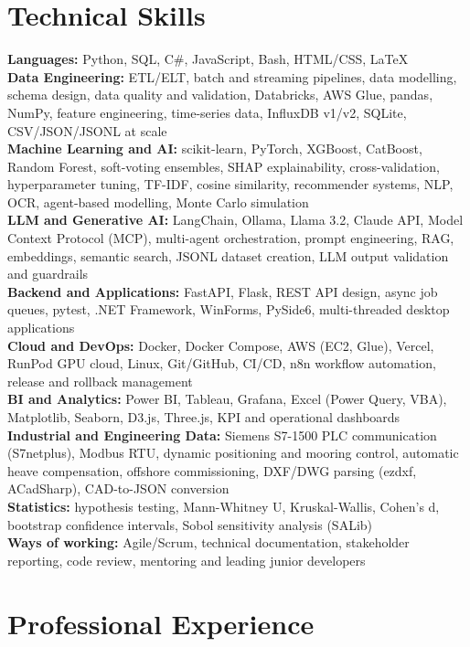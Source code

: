 \documentclass[letterpaper,10pt]{article}
\newcommand{\heading}[1]{\textbf{#1}}
\begin{document}
\section*{Technical Skills}
\heading{Languages:} Python, SQL, C\#, JavaScript, Bash, HTML/CSS, LaTeX\\
\heading{Data Engineering:} ETL/ELT, batch and streaming pipelines, data modelling, schema
design, data quality and validation, Databricks, AWS Glue, pandas, NumPy, feature
engineering, time-series data, InfluxDB v1/v2, SQLite, CSV/JSON/JSONL at scale\\
\heading{Machine Learning and AI:} scikit-learn, PyTorch, XGBoost, CatBoost, Random Forest,
soft-voting ensembles, SHAP explainability, cross-validation, hyperparameter tuning,
TF-IDF, cosine similarity, recommender systems, NLP, OCR, agent-based modelling,
Monte Carlo simulation\\
\heading{LLM and Generative AI:} LangChain, Ollama, Llama 3.2, Claude API, Model Context
Protocol (MCP), multi-agent orchestration, prompt engineering, RAG, embeddings, semantic
search, JSONL dataset creation, LLM output validation and guardrails\\
\heading{Backend and Applications:} FastAPI, Flask, REST API design, async job queues,
pytest, .NET Framework, WinForms, PySide6, multi-threaded desktop applications\\
\heading{Cloud and DevOps:} Docker, Docker Compose, AWS (EC2, Glue), Vercel, RunPod GPU
cloud, Linux, Git/GitHub, CI/CD, n8n workflow automation, release and rollback management\\
\heading{BI and Analytics:} Power BI, Tableau, Grafana, Excel (Power Query, VBA), Matplotlib,
Seaborn, D3.js, Three.js, KPI and operational dashboards\\
\heading{Industrial and Engineering Data:} Siemens S7-1500 PLC communication (S7netplus),
Modbus RTU, dynamic positioning and mooring control, automatic heave compensation,
offshore commissioning, DXF/DWG parsing (ezdxf, ACadSharp), CAD-to-JSON conversion\\
\heading{Statistics:} hypothesis testing, Mann-Whitney U, Kruskal-Wallis, Cohen's d,
bootstrap confidence intervals, Sobol sensitivity analysis (SALib)\\
\heading{Ways of working:} Agile/Scrum, technical documentation, stakeholder reporting,
code review, mentoring and leading junior developers

\section*{Professional Experience}
\end{document}
